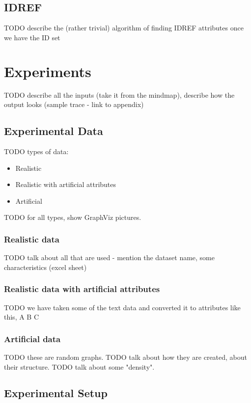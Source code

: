 \documentclass[a4paper,12pt,oneside]{report}
\begin{document}
\section{IDREF}

TODO describe the (rather trivial) algorithm of finding IDREF attributes once we have the ID set

\chapter{Experiments}

TODO describe all the inputs (take it from the mindmap), describe how the output looks (sample trace - link to appendix)

\section{Experimental Data}

TODO types of data:
\begin{itemize}
	\item Realistic 
	\item Realistic with artificial attributes
	\item Artificial
\end{itemize}

TODO for all types, show GraphViz pictures.

\subsection{Realistic data}

TODO talk about all that are used - mention the dataset name, some characteristics (excel sheet)

\subsection{Realistic data with artificial attributes}

TODO we have taken some of the text data and converted it to attributes like this, A B C

\subsection{Artificial data}

TODO these are random graphs.
TODO talk about how they are created, about their structure.
TODO talk about some "density".

\section{Experimental Setup}
\end{document}
